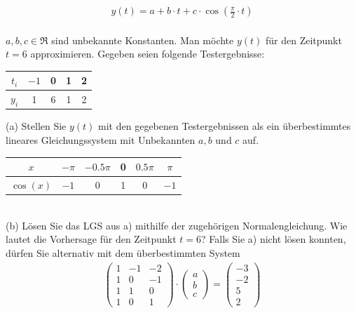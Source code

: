 \documentclass{scrartcl}
\begin{document}
	\begin{align*}
		y(t) = a + b \cdot t + c \cdot \cos\left( \frac{\pi}{2} \cdot t \right)
	\end{align*}
	\\
	$a,b,c \in \Re$ sind unbekannte Konstanten. Man möchte $y(t)$ für den Zeitpunkt $t = 6$ approximieren.
	\n 
	Gegeben seien folgende Testergebnisse:
	\begin{tabular}{c|cccc}
		$t_i$ & $-1$ & 0 & 1 & 2 \\ \midrule
		$y_i$ & 1 & 6 & 1 & 2
	\end{tabular}
	\n
	(a)
	Stellen Sie $y(t)$ mit den gegebenen Testergebnissen als ein überbestimmtes lineares Gleichungssystem mit Unbekannten $a, b$ und $c$ auf.
	\n 
	\begin{tabular}{c|ccccc}
		$x$ & $-\pi$ & $-0.5\pi$ & 0 & $0.5\pi$ & $\pi$ \\ \midrule
		$\cos(x)$ & $-1$ & 0 & 1 & 0 & $-1$
	\end{tabular}
	\lbreak
	\\
	(b)
	Lösen Sie das LGS aus a) mithilfe der zugehörigen Normalengleichung. Wie lautet die Vorhersage für den Zeitpunkt $t=6$?
	\n 
	Falls Sie a) nicht lösen konnten, dürfen Sie alternativ mit dem  überbestimmten System
	\begin{align*}
		\begin{pmatrix}
			1 & -1 & -2 \\
			1 & 0 & -1 \\
			1 & 1 & 0 \\
			1 & 0 & 1
		\end{pmatrix} \cdot 
		\begin{pmatrix}
			a \\ b \\ c
		\end{pmatrix} =
		\begin{pmatrix}
			-3 \\ -2 \\ 5 \\ 2
		\end{pmatrix}
	\end{align*}
\end{document}
